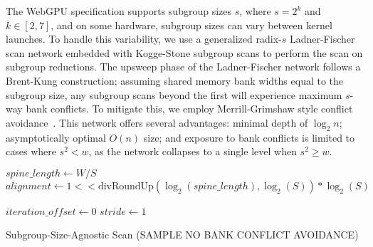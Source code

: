 \documentclass[sigconf]{acmart}
\begin{document}
The WebGPU specification supports subgroup sizes $s$, where $s = 2^k$ and $k \in [2, 7]$, and on some hardware, subgroup sizes can vary between kernel launches. To handle this variability, we use a generalized radix-$s$ Ladner-Fischer scan network embedded with Kogge-Stone subgroup scans to perform the scan on subgroup reductions. The upsweep phase of the Ladner-Fischer network follows a Brent-Kung construction; assuming shared memory bank widths equal to the subgroup size, any subgroup scans beyond the first will experience maximum $s$-way bank conflicts. To mitigate this, we employ Merrill-Grimshaw style conflict avoidance~\cite{}. This network offers several advantages: minimal depth of $\log_2 n$; asymptotically optimal $O(n)$ size; and exposure to bank conflicts is limited to cases where $s^2 < w$, as the network collapses to a single level when $s^2 \geq w$.

\begin{algorithm}[htbp]
  \SetAlgoLined

  $spine\_length \gets W / S$\;
  $alignment \gets 1 << \text{divRoundUp}(\log_2(spine\_length), \log_2(S)) * \log_2(S)$\;

  $iteration\_offset \gets 0$\;
  $stride \gets 1$\;

  \;
  \caption{Subgroup-Size-Agnostic Scan (SAMPLE NO BANK CONFLICT AVOIDANCE)}
  \label{alg:example}
\end{algorithm}
\end{document}
